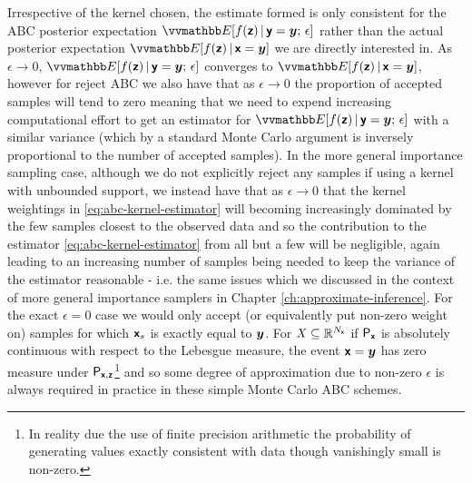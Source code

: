 


Irrespective of the kernel chosen, the estimate formed is only consistent for the \ac{ABC} posterior expectation $\expc{f(\rvct{z}) \gvn \rvct{y} = \vct{y};\,\epsilon}$ rather than the actual posterior expectation $\expc{f(\rvct{z}) \gvn \rvct{x} = \vct{y}}$ we are directly interested in. As $\epsilon \to 0$, $\expc{f(\rvct{z}) \gvn \rvct{y} = \vct{y};\,\epsilon}$ converges to $\expc{f(\rvct{z}) \gvn \rvct{x} = \vct{y}}$, however for reject \ac{ABC} we also have that as $\epsilon \to 0$ the proportion of accepted samples will tend to zero meaning that we need to expend increasing computational effort to get an estimator for $\expc{f(\rvct{z}) \gvn \rvct{y} = \vct{y};\,\epsilon}$ with a similar variance (which by a standard Monte Carlo argument is inversely proportional to the number of accepted samples). In the more general importance sampling case, although we do not explicitly reject any samples if using a kernel with unbounded support, we instead have that as $\epsilon \to 0$ that the kernel weightings in \eqref{eq:abc-kernel-estimator} will becoming increasingly dominated by the few samples closest to the observed data and so the contribution to the estimator \eqref{eq:abc-kernel-estimator} from all but a few will be negligible, again leading to an increasing number of samples being needed to keep the variance of the estimator reasonable - i.e. the same issues which we discussed in the context of more general importance samplers in Chapter \ref{ch:approximate-inference}. For the exact $\epsilon = 0$ case we would only accept (or equivalently put non-zero weight on) samples for which $\boldsymbol{\mathsf{x}}_s$ is exactly equal to $\boldsymbol{y}$. For $\mathit{X} \subseteq \mathbb{R}^{N_{\boldsymbol{\mathsf{x}}}}$ if $\mathsf{P}_{\boldsymbol{\mathsf{x}}}$ is absolutely continuous with respect to the Lebesgue measure, the event $\boldsymbol{\mathsf{x}} = \boldsymbol{y}$ has zero measure under $\mathsf{P}_{\boldsymbol{\mathsf{x}},\boldsymbol{\mathsf{z}}}$\footnote{In reality due the use of finite precision arithmetic the probability of generating values exactly consistent with data though vanishingly small is non-zero.} and so some degree of approximation due to non-zero $\epsilon$ is always required in practice in these simple Monte Carlo \ac{ABC} schemes.

